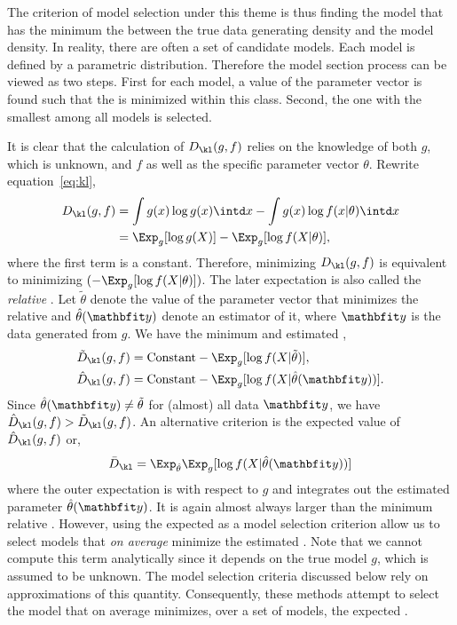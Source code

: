 The criterion of model selection under this theme is thus finding the model
that has the minimum the \kld between the true data generating density and the
model density. In reality, there are often a set of candidate models. Each
model is defined by a parametric distribution. Therefore the model section
process can be viewed as two steps. First for each model, a value of the
parameter vector is found such that the \kld is minimized within this class.
Second, the one with the smallest \kld among all models is selected.

It is clear that the calculation of $D_{\kl}(g,f)$ relies on the knowledge of
both $g$, which is unknown, and $f$ as well as the specific parameter vector
$\theta$. Rewrite equation~\eqref{eq:kl},
\begin{align}
  D_{\kl}(g,f)
  &= \int g(x)\log g(x) \intd x - \int g(x) \log f(x|\theta) \intd x \notag\\
  &= \Exp_g[\log g(X)] - \Exp_g[\log f(X|\theta)],
\end{align}
where the first term is a constant. Therefore, minimizing $D_{\kl}(g,f)$ is
equivalent to minimizing $(-\Exp_g[\log f(X|\theta)])$. The later expectation
is also called the \emph{relative} \kld. Let $\tilde\theta$ denote the value
of the parameter vector that minimizes the relative \kld and
$\hat\theta(\data)$ denote an estimator of it, where $\data$ is the data
generated from $g$. We have the minimum and estimated \kld,
\begin{align}
  \tilde{D}_{\kl}(g,f) &= \text{Constant} - \Exp_g[\log f(X|\tilde\theta)], \\
  \hat{D}_{\kl}(g,f) &= \text{Constant} - \Exp_g[\log f(X|\hat\theta(\data))].
\end{align}
Since $\hat\theta(\data)\ne\tilde\theta$ for (almost) all data $\data$, we
have $\hat{D}_{\kl}(g,f) > \tilde{D}_{\kl}(g,f)$. An alternative criterion is
the expected value of $\hat{D}_{\kl}(g,f)$ or,
\begin{equation}
  \bar{D}_{\kl} = \Exp_{\hat\theta}\Exp_g[\log f(X|\hat\theta(\data))]
  \label{eq:expected kl}
\end{equation}
where the outer expectation is with respect to $g$ and integrates out the
estimated parameter $\hat\theta(\data)$. It is again almost always larger than
the minimum relative \kld. However, using the expected \kld as a model
selection criterion allow us to select models that \emph{on average} minimize
the estimated \kld. Note that we cannot compute this term analytically since
it depends on the true model $g$, which is assumed to be unknown. The model
selection criteria discussed below rely on approximations of this quantity.
Consequently, these methods attempt to select the model that on average
minimizes, over a set of models, the expected \kld.


